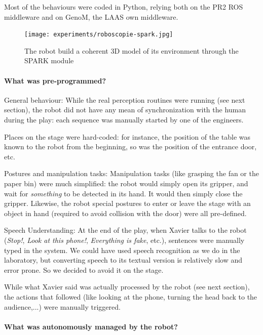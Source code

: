 Most of the behaviours were coded in Python, relying both on the PR2 ROS
middleware and on {\sc GenoM}, the LAAS own middleware.

\begin{figure}
    \centering
    \texttt{[image: experiments/roboscopie-spark.jpg]}
    \caption{The robot build a coherent 3D model of its environment through the
    SPARK module}
    \label{fig|spark}
\end{figure}

\paragraph{What was pre-programmed?}

General behaviour: While the real perception routines were running
(see next section), the robot did not have any mean of synchronization with the
human during the play: each sequence was manually started by one of the
engineers.

Places on the stage were hard-coded: for instance, the position of the table
was known to the robot from the beginning, so was the position of the entrance
door, etc.

Postures and manipulation tasks: Manipulation tasks (like grasping
the fan or the paper bin) were much simplified: the robot would simply open its
gripper, and wait for \emph{something} to be detected in its hand. It would
then simply close the gripper. Likewise, the robot special postures to enter or
leave the stage with an object in hand (required to avoid collision with the
door) were all pre-defined.

Speech Understanding: At the end of the play, when Xavier talks to
the robot (\emph{Stop!}, \emph{Look at this phone!}, \emph{Everything is fake},
etc.), sentences were manually typed in the system. We could have used speech
recognition as we do in the laboratory, but converting speech to its textual
version is relatively slow and error prone. So we decided to avoid it on the
stage.

While what Xavier said was actually processed by the robot (see next section),
the actions that followed (like looking at the phone, turning the head back to
the audience,...) were manually triggered.

\paragraph{What was autonomously managed by the robot?}

